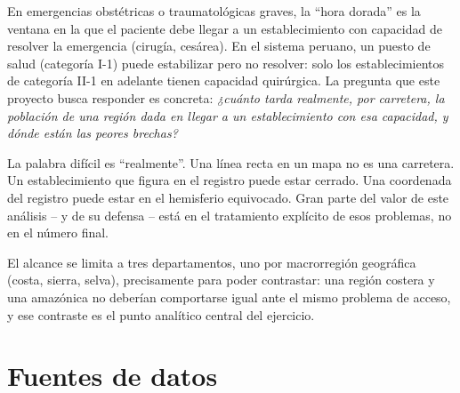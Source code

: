 \documentclass[11pt]{article}
\begin{document}
En emergencias obstétricas o traumatológicas graves, la ``hora dorada'' es
la ventana en la que el paciente debe llegar a un establecimiento con
capacidad de resolver la emergencia (cirugía, cesárea). En el sistema
peruano, un puesto de salud (categoría I-1) puede estabilizar pero no
resolver: solo los establecimientos de categoría II-1 en adelante tienen
capacidad quirúrgica. La pregunta que este proyecto busca responder es
concreta: \emph{¿cuánto tarda realmente, por carretera, la población de una
región dada en llegar a un establecimiento con esa capacidad, y dónde están
las peores brechas?}

La palabra difícil es ``realmente''. Una línea recta en un mapa no es una
carretera. Un establecimiento que figura en el registro puede estar
cerrado. Una coordenada del registro puede estar en el hemisferio
equivocado. Gran parte del valor de este análisis -- y de su defensa --
está en el tratamiento explícito de esos problemas, no en el número final.

El alcance se limita a tres departamentos, uno por macrorregión geográfica
(costa, sierra, selva), precisamente para poder contrastar: una región
costera y una amazónica no deberían comportarse igual ante el mismo
problema de acceso, y ese contraste es el punto analítico central del
ejercicio.

\section{Fuentes de datos}
\end{document}
